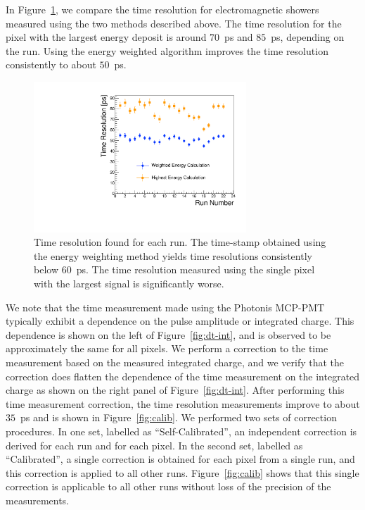 \documentclass[12pt]{article}
\begin{document}
In Figure~\ref{fig:wtres}, we compare the time resolution for electromagnetic
showers measured using the two methods described above. The time resolution for
the pixel with the largest energy deposit is around $70$~ps and $85$~ps,
depending on the run. Using the energy weighted algorithm improves the time
resolution consistently to about $50$~ps. 

\begin{figure}[htbp] 
\centering
\includegraphics[width=8cm]{Images/wtres/tresperrun.pdf} 
\caption{\small Time resolution found for each run. The time-stamp obtained using the energy weighting method yields time resolutions consistently below $60$~ps. The time resolution measured using the single pixel with the largest signal is significantly worse.} 
\label{fig:wtres} 
\end{figure} 

We note that the time measurement made using the Photonis MCP-PMT typically exhibit
a dependence on the pulse amplitude or integrated charge. This dependence is
shown on the left of Figure~\ref{fig:dt-int}, and is observed to be
approximately the same for all pixels. We perform a correction to the time
measurement based on the measured integrated charge, and we verify that the
correction does flatten the dependence of the time measurement on the integrated
charge as shown on the right panel of Figure~\ref{fig:dt-int}. After performing
this time measurement correction, the time resolution measurements improve to
about $35$~ps and is shown in Figure~\ref{fig:calib}. We performed two sets of
correction procedures. In one set, labelled as ``Self-Calibrated'', an
independent correction is derived for each run and for each pixel. In the second
set, labelled as ``Calibrated'', a single correction is obtained for each pixel
from a single run, and this correction is applied to all other runs.
Figure~\ref{fig:calib} shows that this single correction is applicable to all
other runs without loss of the precision of the measurements. 
\end{document}
